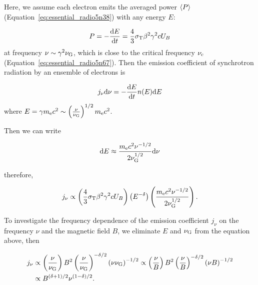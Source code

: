 Here, we assume each electron emits the averaged power $\left\langle P\right\rangle$ (Equation~\ref{eq:essential_radio5n38}) with any energy $E$:

\begin{equation}\label{eq:essential_radio5n71}
    P=-\frac{\mathrm{d} E}{\mathrm{d} t}=\frac{4}{3} \sigma_{\mathrm{T}} \beta^2 \gamma^2 c U_B
\end{equation}
at frequency $\nu \sim \gamma^2\nu_{\mathrm{G}}$, which is close to the critical frequency $\nu_{\mathrm{c}}$ (Equation~\ref{eq:essential_radio5n67}).
Then the emission coefficient of synchrotron radiation by an ensemble of electrons is

\begin{equation}\label{eq:essential_radio5n73}
    j_{\nu} \mathrm{d} \nu=-\frac{\mathrm{d} E}{\mathrm{d} t} n(E) \mathrm{d} E
\end{equation}
where $E = \gamma m_{\mathrm{e}} c^2 \sim \left(\frac{\nu}{\nu_{\mathrm{G}}}\right)^{1/2} m_{\mathrm{e}}c^2$.

Then we can write

\begin{equation}\label{eq:essential_radio5n75}
    \mathrm{d} E \approx \frac{m_{\mathrm{e}} c^2 \nu^{-1 / 2}}{2 \nu_{\mathrm{G}}^{1 / 2}} \mathrm{d} \nu
\end{equation}

therefore,

\begin{equation}\label{eq:essential_radio5n76}
    j_{\nu} \propto\left(\frac{4}{3} \sigma_{\mathrm{T}} \beta^2 \gamma^2 c U_B\right)\left(E^{-\delta}\right)\left(\frac{m_{\mathrm{e}} c^2 \nu^{-1 / 2}}{2 \nu_{\mathrm{G}}^{1 / 2}}\right).
\end{equation}

To investigate the frequency dependence of the emission coefficient $j_{\nu}$ on the frequency $\nu$ and the magnetic field $B$, we eliminate  $E$ and $\nu_{\mathrm{G}}$ from the equation above, then

\begin{equation}\label{eq:essential_radio5n77}
    \begin{aligned}
        j_{\nu} & \propto \left(\frac{\nu}{\nu_{\mathrm{G}}}\right) B^2 \left(\frac{\nu}{\nu_{\mathrm{G}}}\right)^{-\delta / 2} \left(\nu \nu_{\mathrm{G}}\right)^{-1 / 2} \propto \left(\frac{\nu}{B}\right) B^2 \left(\frac{\nu}{B}\right)^{-\delta / 2} \left(\nu B\right)^{-1 / 2}\\
                & \propto B^{(\delta+1) / 2} \nu^{(1-\delta) / 2}.
    \end{aligned}
\end{equation}

